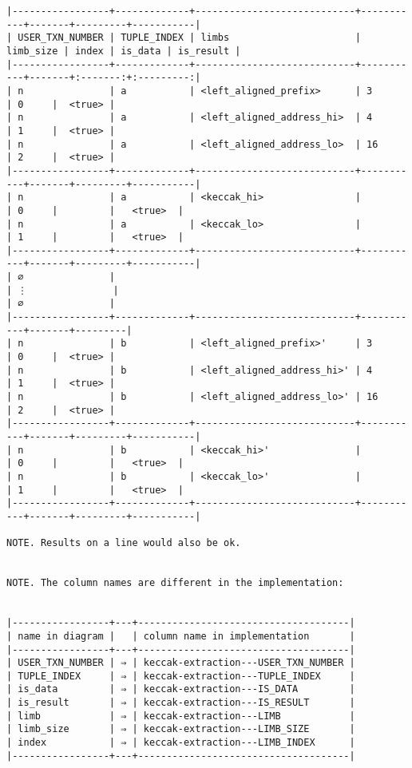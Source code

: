 \documentclass[varwidth=\maxdimen,margin=0.5cm,multi={verbatim}]{standalone}
\begin{document}
\begin{verbatim}
|-----------------+-------------+----------------------------+-----------+-------+---------+-----------|
| USER_TXN_NUMBER | TUPLE_INDEX | limbs                      | limb_size | index | is_data | is_result |
|-----------------+-------------+----------------------------+-----------+-------+:-------:+:---------:|
| n               | a           | <left_aligned_prefix>      | 3         | 0     |  <true> |
| n               | a           | <left_aligned_address_hi>  | 4         | 1     |  <true> |
| n               | a           | <left_aligned_address_lo>  | 16        | 2     |  <true> |
|-----------------+-------------+----------------------------+-----------+-------+---------+-----------|
| n               | a           | <keccak_hi>                |           | 0     |         |   <true>  |
| n               | a           | <keccak_lo>                |           | 1     |         |   <true>  |
|-----------------+-------------+----------------------------+-----------+-------+---------+-----------|
| ∅               |
| ⋮               |
| ∅               |
|-----------------+-------------+----------------------------+-----------+-------+---------|
| n               | b           | <left_aligned_prefix>'     | 3         | 0     |  <true> |
| n               | b           | <left_aligned_address_hi>' | 4         | 1     |  <true> |
| n               | b           | <left_aligned_address_lo>' | 16        | 2     |  <true> |
|-----------------+-------------+----------------------------+-----------+-------+---------+-----------|
| n               | b           | <keccak_hi>'               |           | 0     |         |   <true>  |
| n               | b           | <keccak_lo>'               |           | 1     |         |   <true>  |
|-----------------+-------------+----------------------------+-----------+-------+---------+-----------|

NOTE. Results on a line would also be ok.


NOTE. The column names are different in the implementation:


|-----------------+---+-------------------------------------|
| name in diagram |   | column name in implementation       |
|-----------------+---+-------------------------------------|
| USER_TXN_NUMBER | ⇒ | keccak-extraction---USER_TXN_NUMBER |
| TUPLE_INDEX     | ⇒ | keccak-extraction---TUPLE_INDEX     |
| is_data         | ⇒ | keccak-extraction---IS_DATA         |
| is_result       | ⇒ | keccak-extraction---IS_RESULT       |
| limb            | ⇒ | keccak-extraction---LIMB            |
| limb_size       | ⇒ | keccak-extraction---LIMB_SIZE       |
| index           | ⇒ | keccak-extraction---LIMB_INDEX      |
|-----------------+---+-------------------------------------|

\end{verbatim}
\end{document}

